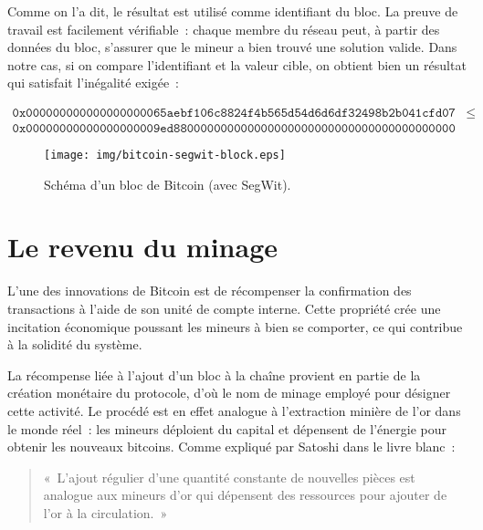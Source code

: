 Comme on l'a dit, le résultat est utilisé comme identifiant du bloc. La preuve de travail est facilement vérifiable~: chaque membre du réseau peut, à partir des données du bloc, s'assurer que le mineur a bien trouvé une solution valide. Dans notre cas, si on compare l'identifiant et la valeur cible, on obtient bien un résultat qui satisfait l'inégalité exigée~:

{ \footnotesize
\begin{align*}
\mathtt{0x000000000000000000065aebf106c8824f4b565d54d6d6df32498b2b041cfd07} & \le \\ \mathtt{0x00000000000000000009ed880000000000000000000000000000000000000000} & ~
\end{align*}
}

\begin{figure}[h]
  \centering
  \texttt{[image: img/bitcoin-segwit-block.eps]}
  \caption{Schéma d'un bloc de Bitcoin (avec SegWit).}
  \label{fig:bitcoin-segwit-block}
\end{figure}

\section*{Le revenu du minage} %


L'une des innovations de Bitcoin est de récompenser la confirmation des transactions à l'aide de son unité de compte interne. Cette propriété crée une incitation économique poussant les mineurs à bien se comporter, ce qui contribue à la solidité du système.

La récompense liée à l'ajout d'un bloc à la chaîne provient en partie de la création monétaire du protocole, d'où le nom de minage employé pour désigner cette activité. Le procédé est en effet analogue à l'extraction minière de l'or dans le monde réel~: les mineurs déploient du capital et dépensent de l'énergie pour obtenir les nouveaux bitcoins. Comme expliqué par Satoshi dans le livre blanc~:

\begin{quote}
«~L'ajout régulier d'une quantité constante de nouvelles pièces est analogue aux mineurs d'or qui dépensent des ressources pour ajouter de l'or à la circulation.~»
\end{quote}


